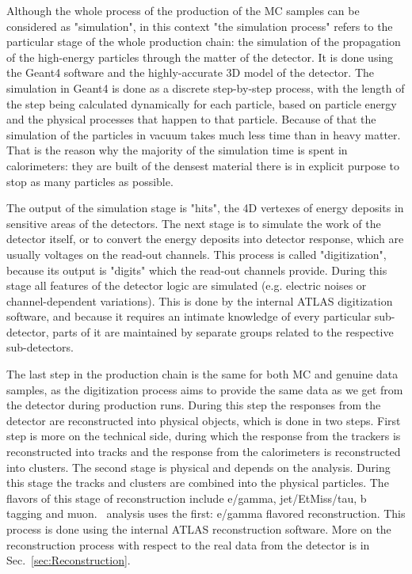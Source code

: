 Although the whole process of the production of the MC samples can be considered as "simulation", in this context "the simulation process" refers to the particular stage of the whole production chain: the simulation of the propagation of the high-energy particles through the matter of the detector. It is done using the Geant4 software and the highly-accurate 3D model of the detector. The simulation in Geant4 is done as a discrete step-by-step process, with the length of the step being calculated dynamically for each particle, based on particle energy and the physical processes that happen to that particle. Because of that the simulation of the particles in vacuum takes much less time than in heavy matter. That is the reason why the majority of the simulation time is spent in calorimeters: they are built of the densest material there is in explicit purpose to stop as many particles as possible.

The output of the simulation stage is "hits", the 4D vertexes of energy deposits in sensitive areas of the detectors. The next stage is to simulate the work of the detector itself, or to convert the energy deposits into detector response, which are usually voltages on the read-out channels. This process is called "digitization", because its output is "digits" which the read-out channels provide. During this stage all features of the detector logic are simulated (e.g. electric noises or channel-dependent variations). This is done by the internal ATLAS digitization software, and because it requires an intimate knowledge of every particular sub-detector, parts of it are maintained by separate groups related to the respective sub-detectors.

The last step in the production chain is the same for both MC and genuine data samples, as the digitization process aims to provide the same data as we get from the detector during production runs. During this step the responses from the detector are reconstructed into physical objects, which is done in two steps. First step is more on the technical side, during which the response from the trackers is reconstructed into tracks and the response from the calorimeters is reconstructed into clusters. The second stage is physical and depends on the analysis. During this stage the tracks and clusters are combined into the physical particles. The flavors of this stage of reconstruction include e/gamma, jet/EtMiss/tau, b tagging and muon. \Zee\ analysis uses the first: e/gamma flavored reconstruction. This process is done using the internal ATLAS reconstruction software. More on the reconstruction process with respect to the real data from the detector is in Sec.~\ref{sec:Reconstruction}.

